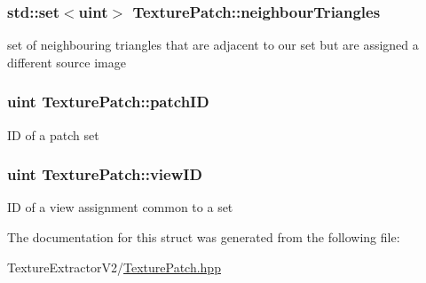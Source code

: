 \subsubsection[{neighbour\+Triangles}]{\setlength{\rightskip}{0pt plus 5cm}std\+::set$<$uint$>$ Texture\+Patch\+::neighbour\+Triangles}\label{struct_texture_patch_a002b3455ab2599b42b78c34c1d887f94}
set of neighbouring triangles that are adjacent to our set but are assigned a different source image \hypertarget{struct_texture_patch_a359bb72c7d9793ff22e9d6272b016521}{}
\subsubsection[{patch\+I\+D}]{\setlength{\rightskip}{0pt plus 5cm}uint Texture\+Patch\+::patch\+I\+D}\label{struct_texture_patch_a359bb72c7d9793ff22e9d6272b016521}
I\+D of a patch set \hypertarget{struct_texture_patch_a97acb0ad9531af6cc0c366640d3575e1}{}
\subsubsection[{view\+I\+D}]{\setlength{\rightskip}{0pt plus 5cm}uint Texture\+Patch\+::view\+I\+D}\label{struct_texture_patch_a97acb0ad9531af6cc0c366640d3575e1}
I\+D of a view assignment common to a set 

The documentation for this struct was generated from the following file\+:\begin{DoxyCompactItemize}
\item 
Texture\+Extractor\+V2/\hyperlink{_texture_patch_8hpp}{Texture\+Patch.\+hpp}\end{DoxyCompactItemize}
